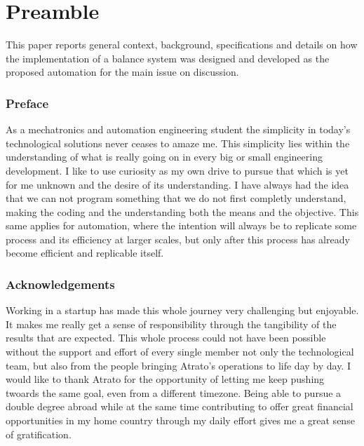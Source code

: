 
\chapter*{Preamble}

This paper reports general context, background, specifications and details on how the implementation of a balance system was designed and developed as the proposed automation for the main issue on discussion.


\subsection*{Preface}

As a mechatronics and automation engineering student the simplicity in today's technological solutions never ceases to amaze me. This simplicity lies within the understanding of what is really going on in every big or small engineering development. I like to use curiosity as my own drive to pursue that which is yet for me unknown and the desire of its understanding. I have always had the idea that we can not program something that we do not first completly understand, making the coding and the understanding both the means and the objective. This same applies for automation, where the intention will always be to replicate some process and its efficiency at larger scales, but only after this process has already become efficient and replicable itself. 

\subsection*{Acknowledgements}

Working in a startup has made this whole journey very challenging but enjoyable. It makes me really get a sense of responsibility through the tangibility of the results that are expected. This whole process could not have been possible without the support and effort of every single member not only the technological team, but also from the people bringing Atrato's operations to life day by day. I would like to thank Atrato for the opportunity of letting me keep pushing twoards the same goal, even from a different timezone. Being able to pursue a double degree abroad while at the same time contributing to offer great financial opportunities in my home country through my daily effort gives me a great sense of gratification. \\

